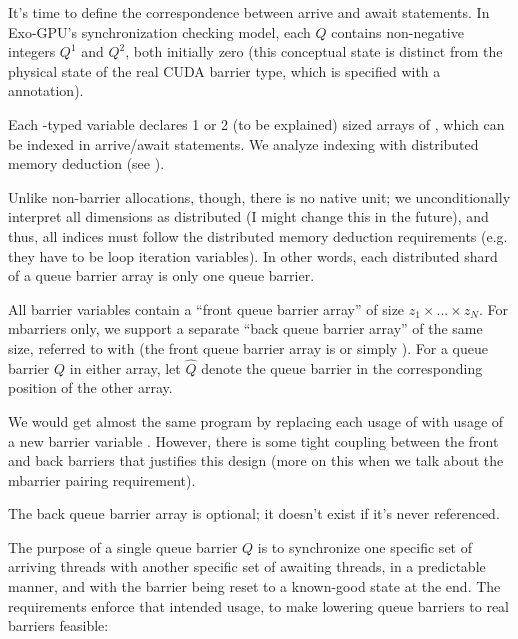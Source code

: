 It's time to define the correspondence between arrive and await statements.
In Exo-GPU's synchronization checking model, each  $Q$ contains non-negative integers  $Q^1$ and  $Q^2$, both initially zero (this conceptual state is distinct from the physical state of the real CUDA barrier type, which is specified with a  annotation).

\filbreak
Each -typed variable declares 1 or 2 (to be explained) sized arrays of , which can be indexed in arrive/await statements. We analyze indexing with distributed memory deduction (see ).



\filbreak
Unlike non-barrier allocations, though, there is no native unit; we unconditionally interpret all dimensions as distributed (I might change this in the future), and thus, all indices must follow the distributed memory deduction requirements (e.g. they have to be  loop iteration variables).
In other words, each distributed shard of a queue barrier array is only one queue barrier.

\filbreak
All barrier variables  contain a ``front queue barrier array'' of size $z_1 \times ... \times z_N$.
For mbarriers only, we support a separate ``back queue barrier array'' of the same size, referred to with  (the front queue barrier array is  or simply ).
For a queue barrier $Q$ in either array, let $\widehat{Q}$ denote the queue barrier in the corresponding position of the other array.

\filbreak
We would get almost the same program by replacing each usage of  with usage of a new barrier variable .
However, there is some tight coupling between the front and back barriers that justifies this design (more on this when we talk about the mbarrier pairing requirement).

\filbreak
The back queue barrier array is optional; it doesn't exist if it's never referenced.

\filbreak
{}

The purpose of a single queue barrier $Q$ is to synchronize one specific set of arriving threads with another specific set of awaiting threads, in a predictable manner, and with the barrier being reset to a known-good state at the end.
The requirements enforce that intended usage, to make lowering queue barriers to real barriers feasible:

